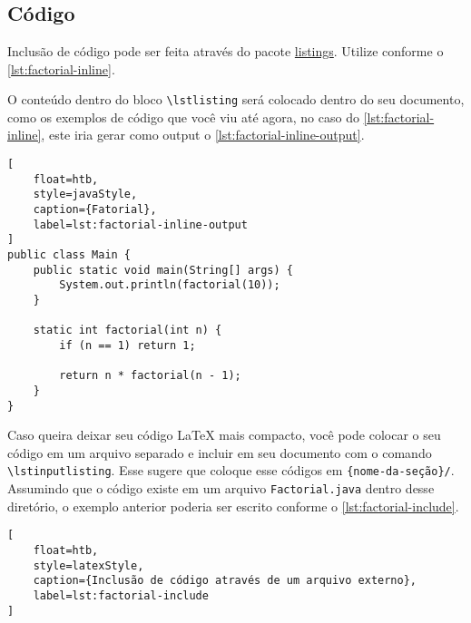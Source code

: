 \chapter{}\label{chap:solucao}

\section{Código}

Inclusão de código pode ser feita através do pacote \href{https://ctan.org/pkg/listings}{listings}. Utilize conforme o \autoref{lst:factorial-inline}.



O conteúdo dentro do bloco \texttt{\textbackslash lstlisting} será colocado dentro do seu documento, como os exemplos de código que você viu até agora, no caso do \autoref{lst:factorial-inline}, este iria gerar como output o \autoref{lst:factorial-inline-output}.

\begin{lstlisting}[
    float=htb, 
    style=javaStyle, 
    caption={Fatorial},
    label=lst:factorial-inline-output
]
public class Main {
    public static void main(String[] args) {
        System.out.println(factorial(10));
    }
    
    static int factorial(int n) {
        if (n == 1) return 1;
        
        return n * factorial(n - 1);
    }
}
\end{lstlisting}

Caso queira deixar seu código \LaTeX{} mais compacto, você pode colocar o seu código em um arquivo separado e incluir em seu documento com o comando \texttt{\textbackslash lstinputlisting}. Esse \template sugere que coloque esse códigos em \contentdir{}\texttt{\{nome-da-seção\}/}\codedir. Assumindo que o código existe em um arquivo \texttt{Factorial.java} dentro desse diretório, o exemplo anterior poderia ser escrito conforme o \autoref{lst:factorial-include}.

\begin{lstlisting}[
    float=htb, 
    style=latexStyle, 
    caption={Inclusão de código através de um arquivo externo},
    label=lst:factorial-include
]

\end{lstlisting}

